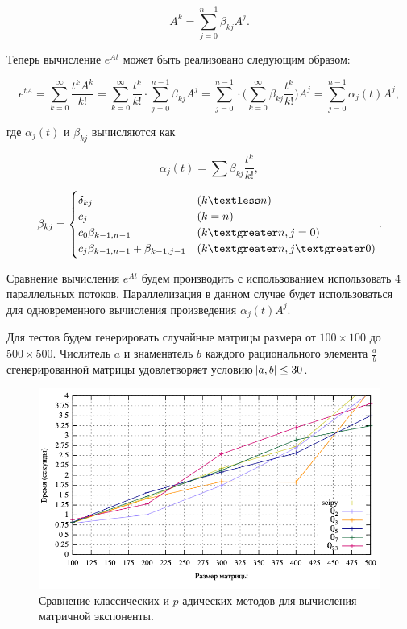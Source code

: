 \documentclass[master, och, times, pract]{sty/SCWorks}
\theoremstyle{plain}
\theoremstyle{definition}
\numberwithin{equation}{section}
\begin{document}
\begin{equation}
A^k=\sum\limits_{j=0}^{n-1} \beta_{kj}A^j.
\end{equation}


\noindent Теперь вычисление $e^{At}$ может быть реализовано следующим образом:


\begin{equation}
e^{tA}=\sum\limits_{k=0}^{\infty} \frac{t^kA^k}{k!}=\sum\limits_{k=0}^{\infty} \frac{t^k}{k!} \cdot \sum\limits_{j=0}^{n-1} \beta_{kj} A^j = \sum\limits_{j=0}^{n-1} \cdot \bigg(\sum\limits_{k=0}^{\infty} \beta_{kj} \frac{t^k}{k!} \bigg) A^j = \sum\limits_{j=0}^{n-1} \alpha_{j}(t)A^j,
\end{equation}

\noindent где $\alpha_{j}(t)$ и $\beta_{kj}$ вычисляются как

\begin{equation}
\alpha_{j}(t)=\sum \beta_{kj} \frac{t^k}{k!},
\end{equation}

\begin{equation}
\beta_{kj} = \begin{cases}
\delta_{kj} & (k \textless n) \\
c_j & (k = n) \\
c_0 \beta_{k-1,n-1} & (k \textgreater n, j=0) \\
c_j \beta_{k-1,n-1}+\beta_{k-1,j-1} & (k \textgreater n, j \textgreater 0)
\end{cases}.
\end{equation}


Сравнение вычисления $e^{At}$ будем производить с использованием использовать 4 параллельных потоков. Параллелизация в данном случае будет использоваться для одновременного вычисления произведения $\alpha_{j}(t)A^j$.

Для тестов будем генерировать случайные матрицы размера от \mbox{$100 \times 100$} до \mbox{$500 \times 500$}. Числитель $a$ и знаменатель $b$ каждого рационального элемента $\frac{a}{b}$ сгенерированной матрицы удовлетворяет условию $\abs{a,b} \leq 30$.

\begin{figure}[H]
\centerline{\includegraphics[width=0.85\linewidth]{../gnuplot/exp/plot.png}}
\caption{Сравнение классических и $p$-адических методов для вычисления матричной экспоненты.}
\label{img:exp:plot}
\end{figure}
\end{document}
